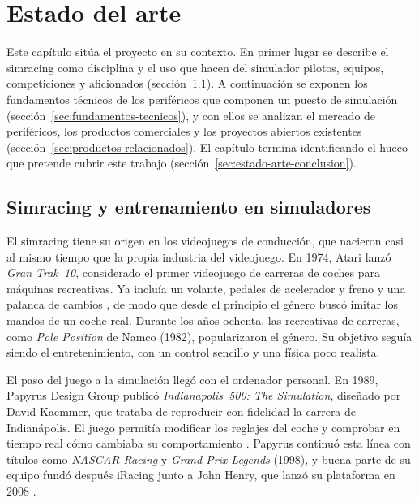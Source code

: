 \chapter{Estado del arte}
\label{cap:estado-arte}
Este capítulo sitúa el proyecto en su contexto. En primer lugar se describe el simracing como disciplina y el uso que hacen del simulador pilotos, equipos, competiciones y aficionados (sección~\ref{sec:simracing-entrenamiento}). A continuación se exponen los fundamentos técnicos de los periféricos que componen un puesto de simulación (sección~\ref{sec:fundamentos-tecnicos}), y con ellos se analizan el mercado de periféricos, los productos comerciales y los proyectos abiertos existentes (sección~\ref{sec:productos-relacionados}). El capítulo termina identificando el hueco que pretende cubrir este trabajo (sección~\ref{sec:estado-arte-conclusion}).

\section{Simracing y entrenamiento en simuladores}
\label{sec:simracing-entrenamiento}

El simracing tiene su origen en los videojuegos de conducción, que nacieron casi al mismo tiempo que la propia industria del videojuego. En 1974, Atari lanzó \textit{Gran Trak~10}, considerado el primer videojuego de carreras de coches para máquinas recreativas. Ya incluía un volante, pedales de acelerador y freno y una palanca de cambios \parencite{wiki_grantrak10}, de modo que desde el principio el género buscó imitar los mandos de un coche real. Durante los años ochenta, las recreativas de carreras, como \textit{Pole Position} de Namco (1982), popularizaron el género. Su objetivo seguía siendo el entretenimiento, con un control sencillo y una física poco realista.

El paso del juego a la simulación llegó con el ordenador personal. En 1989, Papyrus Design Group publicó \textit{Indianapolis~500: The Simulation}, diseñado por David Kaemmer, que trataba de reproducir con fidelidad la carrera de Indianápolis. El juego permitía modificar los reglajes del coche y comprobar en tiempo real cómo cambiaba su comportamiento \parencite{wiki_indy500_sim}. Papyrus continuó esta línea con títulos como \textit{NASCAR Racing} y \textit{Grand Prix Legends} (1998), y buena parte de su equipo fundó después iRacing junto a John Henry, que lanzó su plataforma en 2008 \parencite{iracing_historia}.

